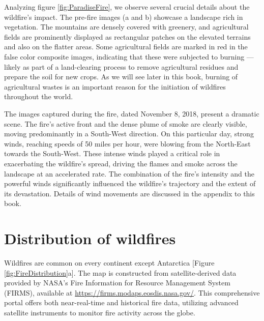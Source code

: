 \documentclass[
  12 pt,
]{Nemilov}
\begin{document}
Analyzing figure \ref{fig:ParadiseFire}, we observe several crucial details about the wildfire's impact. The pre-fire images (a and b) showcase a landscape rich in vegetation. The mountains are densely covered with greenery, and agricultural fields are prominently displayed as rectangular patches on the elevated terrains and also on the flatter areas. Some agricultural fields are marked in red in the false color composite images, indicating that these were subjected to burning --- likely as part of a land-clearing process to remove agricultural residues and prepare the soil for new crops. As we will see later in this book, burning of agricultural wastes is an important reason for the initiation of wildfires throughout the world.

The images captured during the fire, dated November 8, 2018, present a dramatic scene. The fire's active front and the dense plume of smoke are clearly visible, moving predominantly in a South-West direction. On this particular day, strong winds, reaching speeds of 50 miles per hour, were blowing from the North-East towards the South-West. These intense winds played a critical role in exacerbating the wildfire's spread, driving the flames and smoke across the landscape at an accelerated rate. The combination of the fire's intensity and the powerful winds significantly influenced the wildfire's trajectory and the extent of its devastation. Details of wind movements are discussed in the appendix to this book.

\section{Distribution of wildfires}\label{distribution-of-wildfires}

Wildfires are common on every continent except Antarctica {[}Figure \ref{fig:FireDistribution}a{]}. The map is constructed from satellite-derived data provided by NASA's Fire Information for Resource Management System (FIRMS), available at \url{https://firms.modaps.eosdis.nasa.gov/}. This comprehensive portal offers both near-real-time and historical fire data, utilizing advanced satellite instruments to monitor fire activity across the globe.
\end{document}
